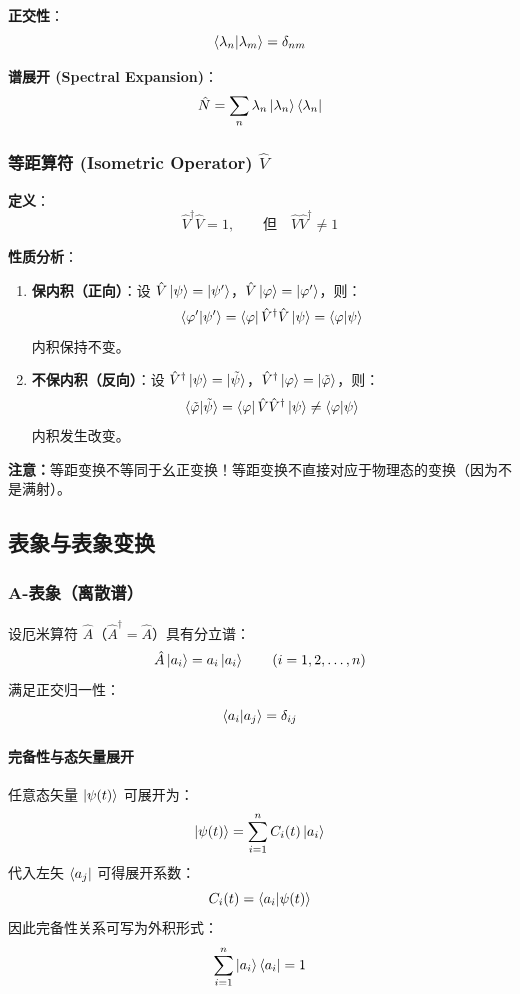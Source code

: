 \documentclass[12pt,a4paper]{article}
\begin{document}
\textbf{正交性}：
\[
\braket{\lambda_n|\lambda_m}=\delta_{nm}
\]

\textbf{谱展开 (Spectral Expansion)}：
\[
\hat{N}=\sum_n\lambda_n\ket{\lambda_n}\bra{\lambda_n}
\]

\subsubsection{\texorpdfstring{等距算符 (Isometric Operator) $\hat{V}$}{等距算符 (Isometric Operator)}}

\textbf{定义}：
\[
\hat{V}^\dagger\hat{V}=1,\qquad \text{但}\quad \hat{V}\hat{V}^\dagger\neq 1
\]

\textbf{性质分析}：

\begin{enumerate}
    \item \textbf{保内积（正向）}：设 $\hat{V}\ket{\psi}=\ket{\psi'}$，$\hat{V}\ket{\varphi}=\ket{\varphi'}$，则：
    \[
    \braket{\varphi'|\psi'}=\bra{\varphi}\hat{V}^\dagger\hat{V}\ket{\psi}=\braket{\varphi|\psi}
    \]
    内积保持不变。
    \item \textbf{不保内积（反向）}：设 $\hat{V}^\dagger\ket{\psi}=\ket{\tilde{\psi}}$，$\hat{V}^\dagger\ket{\varphi}=\ket{\tilde{\varphi}}$，则：
    \[
    \braket{\tilde{\varphi}|\tilde{\psi}}=\bra{\varphi}\hat{V}\hat{V}^\dagger\ket{\psi}\neq\braket{\varphi|\psi}
    \]
    内积发生改变。
\end{enumerate}

\par\smallskip
\noindent\textbf{注意：}等距变换不等同于幺正变换！等距变换不直接对应于物理态的变换（因为不是满射）。
\par\smallskip

\subsection{表象与表象变换}

\subsubsection{A-表象（离散谱）}

设厄米算符 $\hat{A}$（$\hat{A}^\dagger=\hat{A}$）具有分立谱：
\[
\hat{A}\ket{a_i}=a_i\ket{a_i}\qquad (i=1,2,\ldots,n)
\]
满足正交归一性：
\[
\braket{a_i|a_j}=\delta_{ij}
\]

\paragraph{完备性与态矢量展开}
任意态矢量 $\ket{\psi(t)}$ 可展开为：
\[
\ket{\psi(t)}=\sum_{i=1}^{n}C_i(t)\ket{a_i}
\]
代入左矢 $\bra{a_j}$ 可得展开系数：
\[
C_i(t)=\braket{a_i|\psi(t)}
\]
因此完备性关系可写为外积形式：
\[
\sum_{i=1}^{n}\ket{a_i}\bra{a_i}=1
\]
\end{document}
